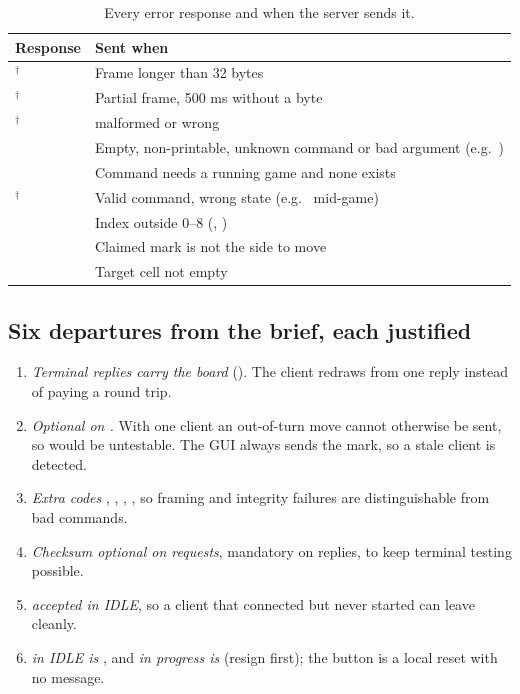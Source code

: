 \begin{table}[t]
\centering
\caption{Every error response and when the server sends it.}
\label{tab:errors}
\footnotesize
\begin{tabular}{@{}L{2.35cm}L{5.65cm}@{}}
\toprule
Response & Sent when \\
\midrule
{}$^\dagger$ & Frame longer than 32 bytes \\
$^\dagger$ & Partial frame, 500 ms without a byte \\
$^\dagger$ &  malformed or wrong \\
 & Empty, non-printable, unknown command or bad argument (e.g.\ ) \\
 & Command needs a running game and none exists \\
$^\dagger$ & Valid command, wrong state (e.g.\  mid-game) \\
 & Index outside 0--8 (, ) \\
 & Claimed mark is not the side to move \\
 & Target cell not empty \\
\bottomrule
\end{tabular}
\end{table}

\subsection{Six departures from the brief, each justified}
\begin{enumerate}\setlength\itemsep{0pt}
\item \emph{Terminal replies carry the board} (). The client redraws from one reply instead of paying a  round trip.
\item \emph{Optional  on .} With one client an out-of-turn move cannot otherwise be sent, so  would be untestable. The GUI always sends the mark, so a stale client is detected.
\item \emph{Extra codes} , , , , so framing and integrity failures are distinguishable from bad commands.
\item \emph{Checksum optional on requests}, mandatory on replies, to keep terminal testing possible.
\item \emph{ accepted in IDLE}, so a client that connected but never started can leave cleanly.
\item \emph{ in IDLE is }, and \emph{ in progress is } (resign first); the button is a local reset with no message.
\end{enumerate}

